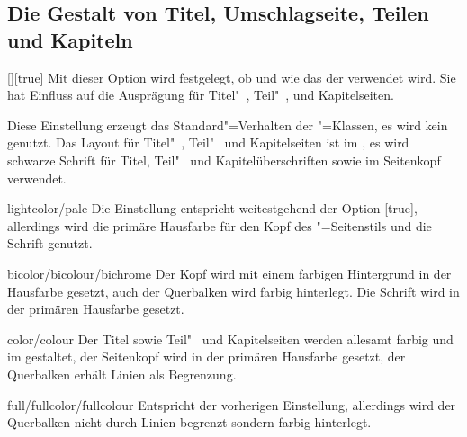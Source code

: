 \subsection{Die Gestalt von Titel, Umschlagseite, Teilen und Kapiteln}
\begin{Declaration}{[\PSet]}[true]
\printdeclarationlist%
%
%
Mit dieser Option wird festgelegt, ob und wie das \CD der \TnUD verwendet wird. 
Sie hat Einfluss auf die Ausprägung für Titel"~, Teil"~, und Kapitelseiten.
%
\begin{values}
\itemfalse
  Diese Einstellung erzeugt das Standard"=Verhalten der \KOMAScript"=Klassen, 
  es wird kein \CD genutzt.
  Das Layout für Titel"~, Teil"~ und Kapitelseiten ist im \CD, es wird 
  schwarze Schrift für Titel, Teil"~ und Kapitelüberschriften sowie im 
  Seitenkopf verwendet.
\item[lightcolor/pale]
  Die Einstellung entspricht weitestgehend der Option [true], 
  allerdings wird die primäre Hausfarbe  für den Kopf des 
  "=Seitenstils und die Schrift genutzt.
\item[bicolor/bicolour/bichrome]
   Der Kopf wird mit einem farbigen Hintergrund in der 
  Hausfarbe gesetzt, auch der Querbalken wird farbig hinterlegt. Die Schrift 
  wird in der primären Hausfarbe gesetzt.
\item[color/colour]
  Der Titel sowie Teil"~ und Kapitelseiten werden allesamt farbig und im \CD 
  gestaltet, der Seitenkopf wird in der primären Hausfarbe  
  gesetzt, der Querbalken erhält Linien als Begrenzung.
\item[full/fullcolor/fullcolour]
   Entspricht der vorherigen Einstellung, allerdings wird der 
  Querbalken nicht durch Linien begrenzt sondern farbig hinterlegt.
\end{values}
\end{Declaration}


